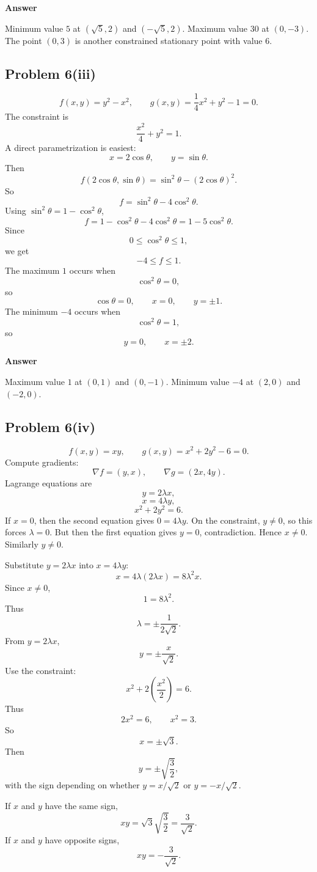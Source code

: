 \documentclass[11pt]{article}
\newenvironment{answerbox}[1]{\par\medskip\noindent\textcolor{linegreen}{\textbf{#1}}\par\smallskip}{\par\medskip}
\newcommand{\grad}{\nabla}
\begin{document}
\begin{answerbox}{Answer}
Minimum value $5$ at $(\sqrt5,2)$ and $(-\sqrt5,2)$.  Maximum value $30$ at $(0,-3)$.  The point $(0,3)$ is another constrained stationary point with value $6$.
\end{answerbox}

\subsection*{Problem 6(iii)}
\[
f(x,y)=y^2-x^2,
\qquad g(x,y)=\frac14x^2+y^2-1=0.
\]
The constraint is
\[
\frac{x^2}{4}+y^2=1.
\]
A direct parametrization is easiest:
\[
x=2\cos\theta,
\qquad y=\sin\theta.
\]
Then
\[
f(2\cos\theta,\sin\theta)=\sin^2\theta-(2\cos\theta)^2.
\]
So
\[
f=\sin^2\theta-4\cos^2\theta.
\]
Using $\sin^2\theta=1-\cos^2\theta$,
\[
f=1-\cos^2\theta-4\cos^2\theta=1-5\cos^2\theta.
\]
Since
\[
0\le\cos^2\theta\le1,
\]
we get
\[
-4\le f\le1.
\]
The maximum $1$ occurs when
\[
\cos^2\theta=0,
\]
so
\[
\cos\theta=0,
\qquad x=0,
\qquad y=\pm1.
\]
The minimum $-4$ occurs when
\[
\cos^2\theta=1,
\]
so
\[
y=0,
\qquad x=\pm2.
\]

\begin{answerbox}{Answer}
Maximum value $1$ at $(0,1)$ and $(0,-1)$.  Minimum value $-4$ at $(2,0)$ and $(-2,0)$.
\end{answerbox}

\subsection*{Problem 6(iv)}
\[
f(x,y)=xy,
\qquad g(x,y)=x^2+2y^2-6=0.
\]
Compute gradients:
\[
\grad f=(y,x),
\qquad \grad g=(2x,4y).
\]
Lagrange equations are
\[
y=2\lambda x,
\]
\[
x=4\lambda y,
\]
\[
x^2+2y^2=6.
\]
If $x=0$, then the second equation gives $0=4\lambda y$.  On the constraint, $y\ne0$, so this forces $\lambda=0$. But then the first equation gives $y=0$, contradiction. Hence $x\ne0$. Similarly $y\ne0$.

Substitute $y=2\lambda x$ into $x=4\lambda y$:
\[
x=4\lambda(2\lambda x)=8\lambda^2x.
\]
Since $x\ne0$,
\[
1=8\lambda^2.
\]
Thus
\[
\lambda=\pm\frac{1}{2\sqrt2}.
\]
From $y=2\lambda x$,
\[
y=\pm\frac{x}{\sqrt2}.
\]
Use the constraint:
\[
x^2+2\left(\frac{x^2}{2}\right)=6.
\]
Thus
\[
2x^2=6,
\qquad x^2=3.
\]
So
\[
x=\pm\sqrt3.
\]
Then
\[
y=\pm\sqrt{\frac32},
\]
with the sign depending on whether $y=x/\sqrt2$ or $y=-x/\sqrt2$.

If $x$ and $y$ have the same sign,
\[
xy=\sqrt3\sqrt{\frac32}=\frac3{\sqrt2}.
\]
If $x$ and $y$ have opposite signs,
\[
xy=-\frac3{\sqrt2}.
\]
\end{document}
